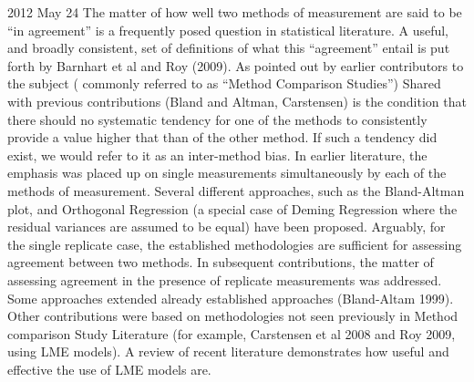 2012 May 24
The matter of how well two methods of measurement are said to be “in agreement” is a frequently posed question in statistical literature. A useful, and broadly consistent, set of definitions of what this “agreement” entail is put forth by Barnhart et al and Roy (2009). 
As pointed out by earlier contributors to the subject ( commonly referred to as “Method Comparison Studies”)
Shared with previous contributions (Bland and Altman, Carstensen) is the condition that there should no systematic  tendency for one of the methods to consistently provide a value higher that than of the other method. If such a tendency did exist, we would refer to it as an inter-method bias.
In earlier literature, the emphasis was placed up on single measurements simultaneously by each of the methods of measurement. Several different approaches, such as the Bland-Altman plot, and Orthogonal Regression (a special case of Deming Regression where the residual variances are assumed to be equal) have been proposed. Arguably, for the single replicate case, the established methodologies are sufficient for assessing agreement between two methods.
In subsequent contributions, the matter of assessing agreement in the presence  of replicate measurements was addressed. Some approaches extended already established approaches (Bland-Altam 1999).  Other contributions were based on methodologies not seen previously in Method comparison Study Literature  (for example, Carstensen et al 2008 and Roy 2009, using LME models). 
A review of recent literature demonstrates how useful and effective the use of LME models are.
